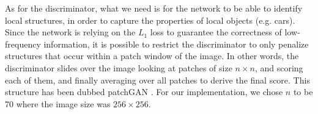 As for the discriminator, what we need is for the network to be able to identify local structures, in order to capture the properties of local objects (e.g. cars). Since the network is relying on the $L_1$ loss to guarantee the correctness of low-frequency information, it is possible to restrict the discriminator to only penalize structures that occur within a patch window of the image. In other words, the discriminator slides over the image looking at patches of size $n \times n$, and scoring each of them, and finally averaging over all patches to derive the final score. This structure has been dubbed patchGAN \cite{pix2pix}. For our implementation, we chose $n$ to be 70 where the image size was $256 \times 256$.
